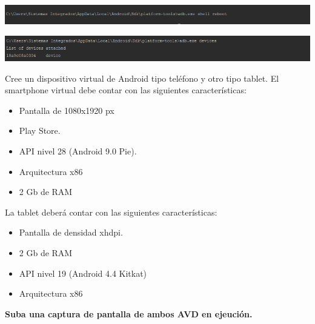 \documentclass[answers]{exam}
\begin{document}
\begin{questions}
\begin{framed}
    \begin{center}
        \includegraphics[width=15.5cm]{img/AndroidADB_01.png}
    \end{center}
    \begin{center}
        \includegraphics[width=15.5cm]{img/AndroidADB_02.png}
    \end{center}
\end{framed}


\begin{framed}
    Cree un dispositivo virtual de Android tipo teléfono y otro tipo tablet. El smartphone virtual debe contar con las siguientes características:
    
    \begin{itemize}
        \item Pantalla de 1080x1920 px
        \item Play Store.
        \item API nivel 28 (Android 9.0 Pie).
        \item Arquitectura x86
        \item 2 Gb de RAM
    \end{itemize}

    La tablet deberá contar con las siguientes características:
    
    \begin{itemize}
        \item Pantalla de densidad xhdpi.
        \item 2 Gb de RAM
        \item API nivel 19 (Android 4.4 Kitkat)
        \item Arquitectura x86
    \end{itemize}
    
    \textbf{Suba una captura de pantalla de ambos AVD en ejeución.}


\end{framed}
\end{questions}
\end{document}
